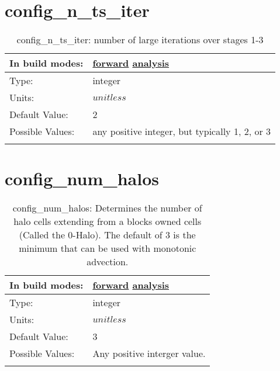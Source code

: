 \section[config\_n\_ts\_iter]{config\_n\_ts\_iter}
\label{sec:nm_sec_config_n_ts_iter}
\begin{center}
\begin{longtable}{| p{2.0in} || p{4.0in} |}
    \hline
    In build modes: & \hyperref[subsec:forward_nm_tab_split_explicit_ts]{forward} \hyperref[subsec:analysis_nm_tab_split_explicit_ts]{analysis} \\
    \hline
    Type: & integer \\
    \hline
    Units: & $unitless$ \\
    \hline
    Default Value: & 2 \\
    \hline
    Possible Values: & any positive integer, but typically 1, 2, or 3 \\
    \hline
    \caption{config\_n\_ts\_iter: number of large iterations over stages 1-3}
\end{longtable}
\end{center}
\section[config\_num\_halos]{config\_num\_halos}
\label{sec:nm_sec_config_num_halos}
\begin{center}
\begin{longtable}{| p{2.0in} || p{4.0in} |}
    \hline
    In build modes: & \hyperref[subsec:forward_nm_tab_decomposition]{forward} \hyperref[subsec:analysis_nm_tab_decomposition]{analysis} \\
    \hline
    Type: & integer \\
    \hline
    Units: & $unitless$ \\
    \hline
    Default Value: & 3 \\
    \hline
    Possible Values: & Any positive interger value. \\
    \hline
    \caption{config\_num\_halos: Determines the number of halo cells extending from a blocks owned cells (Called the 0-Halo). The default of 3 is the minimum that can be used with monotonic advection.}
\end{longtable}
\end{center}
